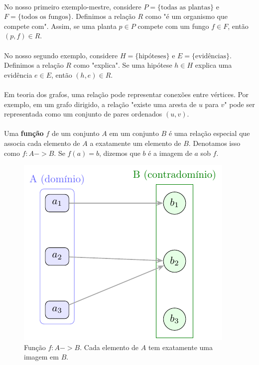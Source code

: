 \documentclass[12pt,a4paper]{article}
\def\emph#1{#1}%
\def\to{->}%
\begin{document}
\paragraph{}
No nosso primeiro exemplo-mestre, considere \(P=\{\text{todas as plantas}\}\) e \(F=\{\text{todos os fungos}\}\). Definimos a relação \(R\) como "é um organismo que compete com". Assim, se uma planta \(p \in P\) compete com um fungo \(f \in F\), então \((p,f) \in R\).

\paragraph{}
No nosso segundo exemplo, considere \(H=\{\text{hipóteses}\}\) e \(E=\{\text{evidências}\}\). Definimos a relação \(R\) como "explica". Se uma hipótese \(h \in H\) explica uma evidência \(e \in E\), então \((h,e) \in R\).

\paragraph{}
Em teoria dos grafos, uma relação pode representar conexões entre vértices. Por exemplo, em um grafo dirigido, a relação "existe uma aresta de \(u\) para \(v\)" pode ser representada como um conjunto de pares ordenados \((u,v)\).

\paragraph{}
Uma \textbf{função} \(f\) de um conjunto \(A\) em um conjunto \(B\) é uma relação especial que associa cada elemento de \(A\) a exatamente um elemento de \(B\). Denotamos isso como \(f: A \to B\). Se \(f(a) = b\), dizemos que \(b\) é a imagem de \(a\) sob \(f\).


\begin{figure}[H]
    \centering
    \includegraphics[width=0.9\linewidth]{figures/fig_funcao.pdf}

    \caption{Função $f\!:\!A\to B$. Cada elemento de $A$ tem \emph{exatamente uma} imagem em $B$.}
    \label{fig:funcao}
    \end{figure}
\end{document}
